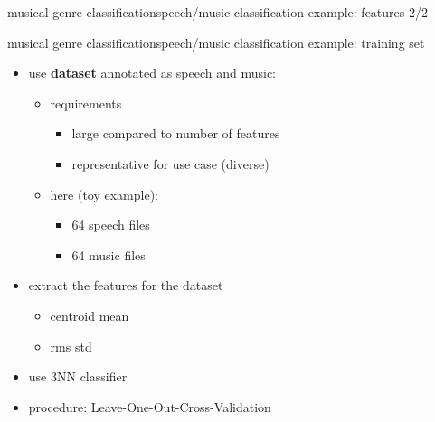         \begin{frame}{musical genre classification}{speech/music classification example: features 2/2}
        \end{frame}

        \begin{frame}{musical genre classification}{speech/music classification example: training set}
            \begin{itemize}
                \item	use \textbf{dataset} annotated as speech and music:
                    \begin{itemize}
                        \item	requirements
                            \begin{itemize}
                                \item	large compared to number of features
                                \item	representative for use case (diverse)
                            \end{itemize}
                        \item	here (toy example):
                            \begin{itemize}
                                \item	64 speech files
                                \item	64 music files
                            \end{itemize}
                    \end{itemize}
                \bigskip
                \item	extract the features for the dataset
                    \begin{itemize}
                        \item   centroid mean
                        \item   rms std
                    \end{itemize}
                \bigskip
                \item	use 3NN classifier
                \bigskip
                \item	procedure: Leave-One-Out-Cross-Validation
            \end{itemize}
        \end{frame}

